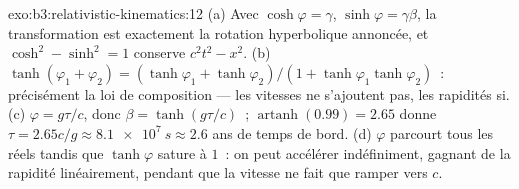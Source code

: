 \begin{solution}{exo:b3:relativistic-kinematics:12}
(a) Avec $\cosh\varphi = \gamma$, $\sinh\varphi = \gamma\beta$, la
transformation est exactement la rotation hyperbolique annoncée, et
$\cosh^2 - \sinh^2 = 1$ conserve $c^2t^2 - x^2$. (b)
$\tanh(\varphi_1 + \varphi_2) = (\tanh\varphi_1 + \tanh\varphi_2)/(1 +
\tanh\varphi_1\tanh\varphi_2)$~: précisément la loi de composition ---
les vitesses ne s'ajoutent pas, les rapidités si. (c) $\varphi = g\tau/c$, donc
$\beta = \tanh(g\tau/c)$~; $\operatorname{artanh}(0.99) = 2.65$ donne
$\tau = 2.65c/g \approx \qty{8.1e7}{s} \approx 2.6$ ans de temps de
bord. (d) $\varphi$ parcourt tous les réels tandis que $\tanh\varphi$
sature à $1$~: on peut accélérer indéfiniment, gagnant de la rapidité
linéairement, pendant que la vitesse ne fait que ramper vers $c$.
\end{solution}


